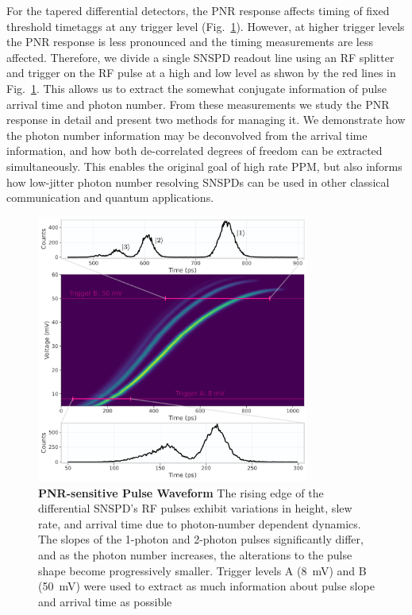 \documentclass[11pt]{caltech_thesis} %
\begin{document}
For the tapered differential detectors, the PNR response affects timing
of fixed threshold timetaggs at any trigger level
(Fig.~\ref{fig:waveform}). However, at higher trigger levels the PNR
response is less pronounced and the timing measurements are less
affected. Therefore, we divide a single SNSPD readout line using an RF
splitter and trigger on the RF pulse at a high and low level as shwon by
the red lines in Fig.~\ref{fig:waveform}. This allows us to extract the
somewhat conjugate information of pulse arrival time and photon number.
From these measurements we study the PNR response in detail and present
two methods for managing it. We demonstrate how the photon number
information may be deconvolved from the arrival time information, and
how both de-correlated degrees of freedom can be extracted
simultaneously. This enables the original goal of high rate PPM, but
also informs how low-jitter photon number resolving SNSPDs can be used
in other classical communication and quantum applications.

\hypertarget{fig:waveform}{%
\begin{figure}
\centering
\includegraphics[width=0.8\textwidth,height=\textheight]{chapter_03/figs_03/waveform_light.pdf}
\caption[{PNR-sensitive Pulse Waveform}]{\textbf{PNR-sensitive Pulse
Waveform} The rising edge of the differential SNSPD's RF pulses exhibit
variations in height, slew rate, and arrival time due to photon-number
dependent dynamics. The slopes of the 1-photon and 2-photon pulses
significantly differ, and as the photon number increases, the
alterations to the pulse shape become progressively smaller. Trigger
levels A (8~mV) and B (50~mV) were used to extract as much information
about pulse slope and arrival time as possible}
\label{fig:waveform}
\end{figure}
}
\end{document}
